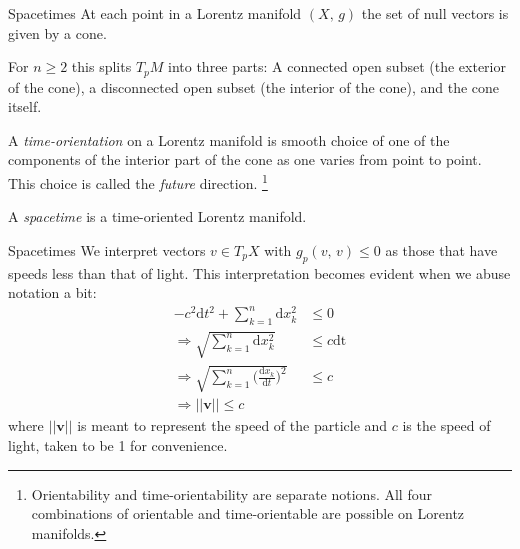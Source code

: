 \documentclass{beamer}
\begin{document}
    \begin{frame}{Spacetimes}
        At each point in a Lorentz manifold $(X,\,g)$ the set of null vectors
        is given by a cone.
        \par\hfill\par
        For $n\geq{2}$ this splits $T_{p}M$ into three
        parts: A connected open subset (the exterior of the cone), a
        disconnected open subset (the interior of the cone),
        and the cone itself.
        \par\hfill\par
        A \textit{time-orientation} on a Lorentz manifold is smooth choice of
        one of the components of the interior part of the cone as one varies
        from point to point. This choice is called the \textit{future}
        direction.%
        \footnote{%
            Orientability and time-orientability are separate notions. All four
            combinations of orientable and time-orientable are possible on
            Lorentz manifolds.
        }
        \par\hfill\par
        A \textit{spacetime} is a time-oriented Lorentz manifold.
    \end{frame}
    \begin{frame}{Spacetimes}
        We interpret vectors $v\in{T}_{p}X$ with
        $g_{p}(v,\,v)\leq{0}$ as those that have speeds less than that of light.
        This interpretation becomes evident when we abuse notation a bit:
        \begin{align}
            -c^{2}\textrm{d}t^{2}+\sum_{k=1}^{n}\textrm{d}x_{k}^{2}
            &\leq{0}\\
            \Rightarrow
            \sqrt{\sum_{k=1}^{n}\textrm{d}x_{k}^{2}}
            &\leq{c}\textrm{dt}\\
            \Rightarrow
            \sqrt{\sum_{k=1}^{n}\big(\frac{\textrm{d}x_{k}}{\textrm{d}t}\big)^{2}}
            &\leq{c}\\
            \Rightarrow
            ||\mathbf{v}||\leq{c}
        \end{align}
        where $||\mathbf{v}||$ is meant to represent the speed of the particle
        and $c$ is the speed of light, taken to be 1 for convenience.
    \end{frame}
\end{document}
